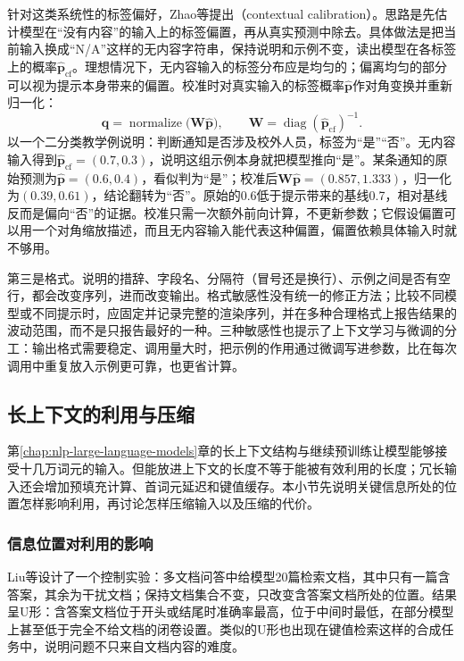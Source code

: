 针对这类系统性的标签偏好，Zhao等提出（contextual calibration）。思路是先估计模型在“没有内容”的输入上的标签偏置，再从真实预测中除去。具体做法是把当前输入换成“N/A”这样的无内容字符串，保持说明和示例不变，读出模型在各标签上的概率$\hat{\bm p}_{\mathrm{cf}}$。理想情况下，无内容输入的标签分布应是均匀的；偏离均匀的部分可以视为提示本身带来的偏置。校准时对真实输入的标签概率$\hat{\bm p}$作对角变换并重新归一化：
\begin{equation}
 \bm q=\operatorname{normalize}\bigl(\bm W\hat{\bm p}\bigr),
 \qquad \bm W=\operatorname{diag}(\hat{\bm p}_{\mathrm{cf}})^{-1}.
 \label{eq:nlp-inference-calibration}
\end{equation}
以一个二分类教学例说明：判断通知是否涉及校外人员，标签为“是”“否”。无内容输入得到$\hat{\bm p}_{\mathrm{cf}}=(0.7,0.3)$，说明这组示例本身就把模型推向“是”。某条通知的原始预测为$\hat{\bm p}=(0.6,0.4)$，看似判为“是”；校准后$\bm W\hat{\bm p}=(0.857,1.333)$，归一化为$(0.39,0.61)$，结论翻转为“否”。原始的0.6低于提示带来的基线0.7，相对基线反而是偏向“否”的证据。校准只需一次额外前向计算，不更新参数；它假设偏置可以用一个对角缩放描述，而且无内容输入能代表这种偏置，偏置依赖具体输入时就不够用。

第三是格式。说明的措辞、字段名、分隔符（冒号还是换行）、示例之间是否有空行，都会改变序列，进而改变输出。格式敏感性没有统一的修正方法；比较不同模型或不同提示时，应固定并记录完整的渲染序列，并在多种合理格式上报告结果的波动范围，而不是只报告最好的一种。三种敏感性也提示了上下文学习与微调的分工：输出格式需要稳定、调用量大时，把示例的作用通过微调写进参数，比在每次调用中重复放入示例更可靠，也更省计算。

\subsection{长上下文的利用与压缩}
\label{sec:nlp-inference-long-input}

第\ref{chap:nlp-large-language-models}章的长上下文结构与继续预训练让模型能够接受十几万词元的输入。但能放进上下文的长度不等于能被有效利用的长度；冗长输入还会增加预填充计算、首词元延迟和键值缓存。本小节先说明关键信息所处的位置怎样影响利用，再讨论怎样压缩输入以及压缩的代价。

\subsubsection{信息位置对利用的影响}
\label{sec:nlp-inference-lost-middle}

Liu等设计了一个控制实验：多文档问答中给模型20篇检索文档，其中只有一篇含答案，其余为干扰文档；保持文档集合不变，只改变含答案文档所处的位置。结果呈U形：含答案文档位于开头或结尾时准确率最高，位于中间时最低，在部分模型上甚至低于完全不给文档的闭卷设置。类似的U形也出现在键值检索这样的合成任务中，说明问题不只来自文档内容的难度。

